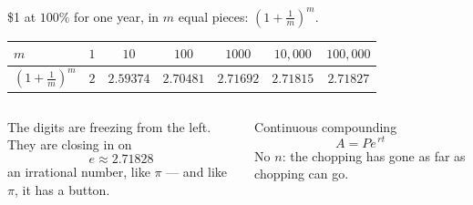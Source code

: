 \documentclass[aspectratio=169, 11pt]{beamer}
\begin{document}
\begin{frame}[t, plain]
  \begin{center}
    {\footnotesize \$1 at $100\%$ for one year, in $m$ equal pieces: $\left(1+\frac1m\right)^{m}$.}
    \\[6pt]
    \footnotesize
    \renewcommand{\arraystretch}{1.3}
    \begin{tabular}{|l|c|c|c|c|c|c|}
    \hline
    $m$ & $1$ & $10$ & $100$ & $1000$ & $10{,}000$ & $100{,}000$ \\
    \hline
    $\left(1+\frac1m\right)^{m}$ & $2$ & $2.59374$ & $2.70481$ & $2.71692$ & $2.71815$ & $2.71827$ \\
    \hline
    \end{tabular}
  \end{center}
  \vspace{8pt}
  \begin{columns}[T]
    \begin{column}{0.46\textwidth}
      \footnotesize The digits are freezing from the left. They are closing in on
      \[ e \approx 2.71828 \]
      an irrational number, like $\pi$ --- and like $\pi$, it has a button.
    \end{column}
    \begin{column}{0.50\textwidth}
      \begin{block}{Continuous compounding}
        \[ A = Pe^{\,rt} \]
        \footnotesize No $n$: the chopping has gone as far as chopping can go.
      \end{block}
    \end{column}
  \end{columns}
\end{frame}
\end{document}
